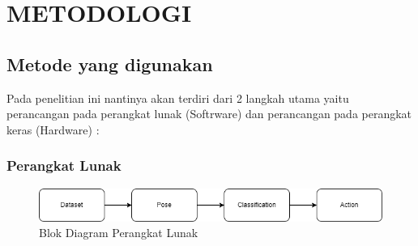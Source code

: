 \section{METODOLOGI}


\subsection{Metode yang digunakan}

Pada penelitian ini nantinya akan terdiri dari 2 langkah utama yaitu perancangan pada perangkat lunak (Softrware) dan perancangan pada perangkat keras (Hardware) :

\subsubsection{Perangkat Lunak}

\begin{figure}[!htbp]
	\centering
	\includegraphics[width=1\linewidth]{gambar/gambar3.1}
	\caption{Blok Diagram Perangkat Lunak}
	\label{fig:gambar31}
\end{figure}

